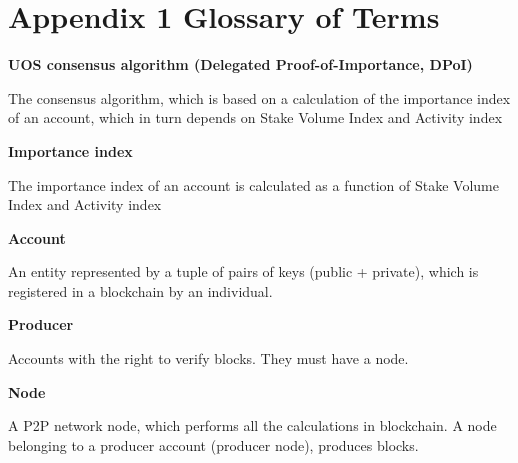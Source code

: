 \documentclass[a4paper,12pt]{article}
\begin{document}
\section {Appendix 1 Glossary of Terms}

\textbf{UOS consensus algorithm (Delegated Proof-of-Importance, DPoI)}

The consensus algorithm, which is based on a calculation of the importance index of an account, which in turn depends on Stake Volume Index and Activity index

\textbf{Importance index}

The importance index of an account is calculated as a function of Stake Volume Index and Activity index

\textbf{Account}

An entity represented by a tuple of pairs of keys (public + private), which is registered in a blockchain by an individual.

\textbf{Producer}

Accounts with the right to verify blocks. They must have a node.

\textbf{Node}

A P2P network node, which performs all the calculations in blockchain. A node belonging to a producer account (producer node), produces blocks.

\tableofcontents
\end{document}
